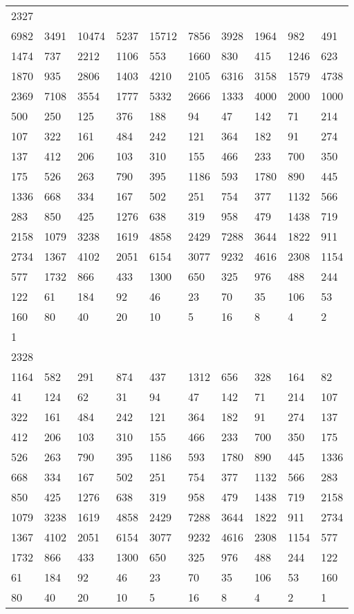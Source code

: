 \begin{longtable}{*{10}{l}}
2327&&&&&&&&&\\
6982& 3491& 10474& 5237& 15712& 7856& 3928& 1964& 982& 491\\
1474& 737& 2212& 1106& 553& 1660& 830& 415& 1246& 623\\
1870& 935& 2806& 1403& 4210& 2105& 6316& 3158& 1579& 4738\\
2369& 7108& 3554& 1777& 5332& 2666& 1333& 4000& 2000& 1000\\
500& 250& 125& 376& 188& 94& 47& 142& 71& 214\\
107& 322& 161& 484& 242& 121& 364& 182& 91& 274\\
137& 412& 206& 103& 310& 155& 466& 233& 700& 350\\
175& 526& 263& 790& 395& 1186& 593& 1780& 890& 445\\
1336& 668& 334& 167& 502& 251& 754& 377& 1132& 566\\
283& 850& 425& 1276& 638& 319& 958& 479& 1438& 719\\
2158& 1079& 3238& 1619& 4858& 2429& 7288& 3644& 1822& 911\\
2734& 1367& 4102& 2051& 6154& 3077& 9232& 4616& 2308& 1154\\
577& 1732& 866& 433& 1300& 650& 325& 976& 488& 244\\
122& 61& 184& 92& 46& 23& 70& 35& 106& 53\\
160& 80& 40& 20& 10& 5& 16& 8& 4& 2\\
1& \\

2328&&&&&&&&&\\
1164& 582& 291& 874& 437& 1312& 656& 328& 164& 82\\
41& 124& 62& 31& 94& 47& 142& 71& 214& 107\\
322& 161& 484& 242& 121& 364& 182& 91& 274& 137\\
412& 206& 103& 310& 155& 466& 233& 700& 350& 175\\
526& 263& 790& 395& 1186& 593& 1780& 890& 445& 1336\\
668& 334& 167& 502& 251& 754& 377& 1132& 566& 283\\
850& 425& 1276& 638& 319& 958& 479& 1438& 719& 2158\\
1079& 3238& 1619& 4858& 2429& 7288& 3644& 1822& 911& 2734\\
1367& 4102& 2051& 6154& 3077& 9232& 4616& 2308& 1154& 577\\
1732& 866& 433& 1300& 650& 325& 976& 488& 244& 122\\
61& 184& 92& 46& 23& 70& 35& 106& 53& 160\\
80& 40& 20& 10& 5& 16& 8& 4& 2& 1\\


\end{longtable}
